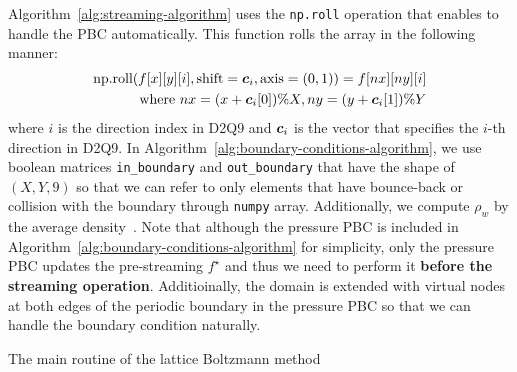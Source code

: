 Algorithm~\ref{alg:streaming-algorithm} uses
the {\tt np.roll} operation that enables
to handle the PBC automatically.
This function rolls the array in the following manner:
\begin{equation}
\begin{aligned}
  \text{np.roll}(f[x][y][i], \text{shift}=\boldsymbol{c}_i, \text{axis}=(0, 1)) =
  f[nx][ny][i] \\
  \text{where }
  nx = (x + \boldsymbol{c}_i[0]) \% X,
  ny = (y + \boldsymbol{c}_i[1]) \% Y
\end{aligned}
\end{equation}
where $i$ is the direction index in D2Q9 and $\boldsymbol{c}_i$ is the vector
that specifies the $i$-th direction in D2Q9.
In Algorithm~\ref{alg:boundary-conditions-algorithm},
we use boolean matrices {\tt in\_boundary} and {\tt out\_boundary}
that have the shape of $(X, Y, 9)$ so that 
we can refer to only elements that have bounce-back or collision
with the boundary through {\tt numpy} array.
Additionally, we compute $\rho_w$ by the average density~\cite{khajepor2019study}.
Note that 
although the pressure PBC is included in Algorithm~\ref{alg:boundary-conditions-algorithm}
for simplicity,
only the pressure PBC updates the pre-streaming $f^\star$
and thus we need to perform it {\bf before the streaming operation}.
Additioinally, the domain is extended with virtual nodes 
at both edges of the periodic boundary in the pressure PBC
so that we can handle the boundary condition naturally. 


\begin{algorithm}[tb]
  \caption{The main routine of the lattice Boltzmann method}
  \label{alg:lattice-boltzmann-method-algorithm}
  \begin{algorithmic}[1]
     
    \State{$\rho(\xv, 0) = \rho_0, \uv(\xv, 0) = \uv_0$ for all $\xv \in [0, X) \times [0, Y)$}
    \EndFor
    \EndFunction
  \end{algorithmic}
\end{algorithm}

